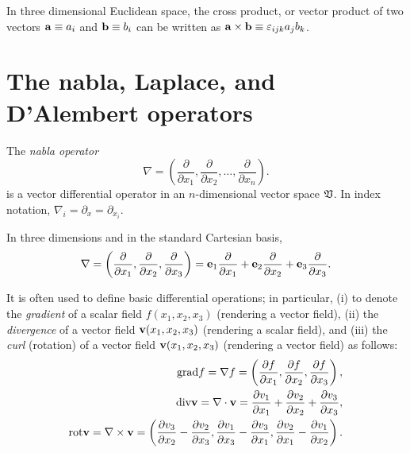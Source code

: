 In three dimensional Euclidean space,
the cross product, or vector product
of two vectors
${\bf a}\equiv a_i$
and
${\bf b}\equiv b_i$
can be written as
${\bf a} \times {\bf b}\equiv \varepsilon_{ijk}a_jb_k$.

\section{The nabla, Laplace, and D'Alembert operators}

The {\em nabla operator}
\begin{equation}
\nabla =\left(
\frac{\partial }{\partial x_1},
\frac{\partial }{\partial x_2},
\ldots ,
\frac{\partial }{\partial x_n}
\right).
\end{equation}
is a vector differential operator in an $n$-dimensional vector space $\frak V$.
In index notation, $\nabla_i  =\partial_x =\partial_{x_i}$.

In three dimensions and in the standard Cartesian basis,
\begin{equation}
\nabla = \left(
\frac{\partial }{\partial x_1},
\frac{\partial }{\partial x_2},
\frac{\partial }{\partial x_3}
\right)
={\bf e}_1\frac{\partial }{\partial x_1}
+{\bf e}_2\frac{\partial }{\partial x_2}
+{\bf e}_3\frac{\partial }{\partial x_3}
.
\end{equation}

It is often used to define basic differential operations;
in particular, (i) to denote the {\em gradient} of a scalar field $f(x_1,x_2,x_3)$ (rendering a vector field),
(ii) the {\em divergence} of a vector field ${\bf v}(x_1,x_2,x_3)$
(rendering a scalar field), and
(iii) the {\em curl} (rotation) of a vector field  ${\bf v}(x_1,x_2,x_3)$ (rendering a vector field)
as follows:
\begin{eqnarray}
\textrm{grad} f = \nabla f = \left(
\frac{\partial f}{\partial x_1},
\frac{\partial f}{\partial x_2},
\frac{\partial f}{\partial x_3}
\right)  ,\\
\textrm{div}  {\bf v} = \nabla \cdot {\bf v} =
\frac{\partial v_1}{\partial x_1}+
\frac{\partial v_2}{\partial x_2}+
\frac{\partial v_3}{\partial x_3}
  ,\\
\textrm{rot} {\bf v} = \nabla \times {\bf v} = \left(
\frac{\partial v_3}{\partial x_2}-
\frac{\partial v_2}{\partial x_3}
,
\frac{\partial v_1}{\partial x_3}-
\frac{\partial v_3}{\partial x_1}
,
\frac{\partial v_2}{\partial x_1}-
\frac{\partial v_1}{\partial x_2}
\right).
\end{eqnarray}

